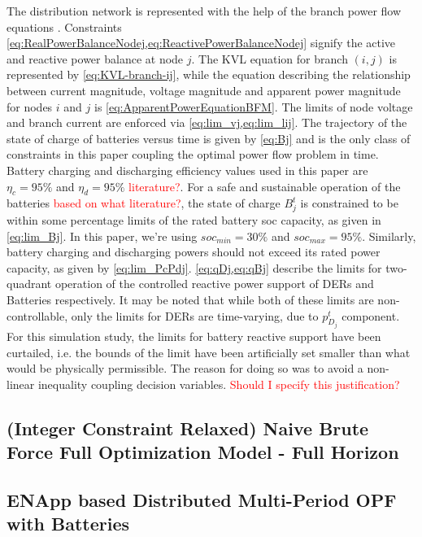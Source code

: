 \documentclass[../../outputs/main.tex]{subfiles}
\begin{document}
The distribution network is represented with the help of the branch power flow equations . Constraints \cref{eq:RealPowerBalanceNodej,eq:ReactivePowerBalanceNodej} signify the active and reactive power balance at node $j$. 
The KVL equation for branch $(i, j)$ is represented by \cref{eq:KVL-branch-ij}, while the equation describing the relationship between current magnitude, voltage magnitude and apparent power magnitude for nodes $i$ and $j$ is \cref{eq:ApparentPowerEquationBFM}. The limits of node voltage and branch current are enforced via \cref{eq:lim_vj,eq:lim_lij}. The trajectory of the state of charge of batteries versus time is given by \cref{eq:Bj} and is the only class of constraints in this paper coupling the optimal power flow problem in time. Battery charging and discharging efficiency values used in this paper are $\eta_c = 95\%$ and $\eta_d = 95\%$ \textcolor{red}{literature?}. For a safe and sustainable operation of the batteries \textcolor{red}{based on what literature?}, the state of charge $B^{t}_{j}$ is constrained to be within some percentage limits of the rated battery soc capacity, as given in \cref{eq:lim_Bj}. In this paper, we're using $soc_{min} = 30\%$ and $soc_{max} = 95\%$. Similarly, battery charging and discharging powers should not exceed its rated power capacity, as given by \cref{eq:lim_PcPdj}.  \cref{eq:qDj,eq:qBj} describe the limits for two-quadrant operation of the controlled reactive power support of DERs and Batteries respectively. It may be noted that while both of these limits are non-controllable, only the limits for DERs are time-varying, due to $p^{t}_{D_j}$ component. For this simulation study, the limits for battery reactive support have been curtailed, i.e. the bounds of the limit have been artificially set smaller than what would be physically permissible. The reason for doing so was to avoid a non-linear inequality coupling decision variables. \textcolor{red}{Should I specify this justification?}


\subsection*{(Integer Constraint Relaxed) Naive Brute Force Full Optimization Model - Full Horizon}



\subsection{ENApp based Distributed Multi-Period OPF with Batteries}
\end{document}

